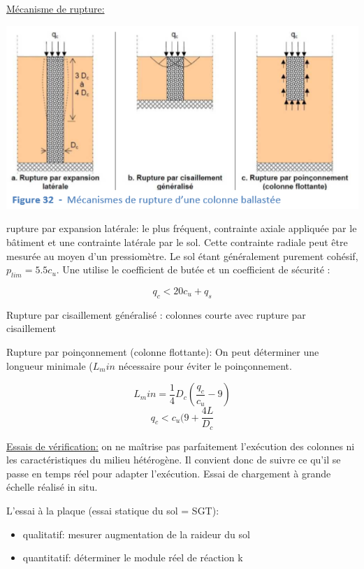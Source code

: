 \medskip
\underline{Mécanisme de rupture:}

\begin{center}
\includegraphics [scale=0.7]{pictures/32.PNG}
\end{center}

rupture par expansion latérale: le plus fréquent, contrainte axiale appliquée par le bâtiment et une contrainte latérale par le sol. Cette contrainte radiale peut être mesurée au moyen d'un pressiomètre. Le sol étant généralement purement cohésif, $p_{lim} = 5.5 c_u$. Une utilise le coefficient de butée et un coefficient de sécurité :

$$ q_c < 20 c_u + q_s$$

\medskip 

Rupture par cisaillement généralisé : colonnes courte avec rupture par cisaillement

\medskip

Rupture par poinçonnement (colonne flottante): On peut déterminer une longueur minimale ($L_min$ nécessaire pour éviter le poinçonnement. 

$$L_min = \frac{1}{4} D_c (\frac{q_c}{c_u}-9)$$
$$q_c < c_u (9+\frac{4L}{D_c}$$

\medskip

\underline{Essais de vérification:} on ne maîtrise pas parfaitement l'exécution des colonnes ni les caractéristiques du milieu hétérogène. Il convient donc de suivre ce qu'il se passe en temps réel pour adapter l'exécution. Essai de chargement à grande échelle réalisé in situ. 

L'essai à la plaque (essai statique du sol = SGT):
\begin{itemize}
    \item qualitatif: mesurer augmentation de la raideur du sol
    \item quantitatif: déterminer le module réel de réaction k
\end{itemize}

